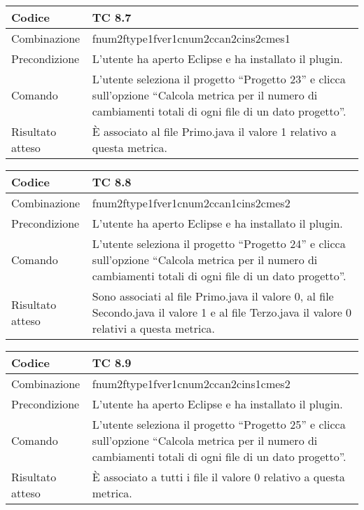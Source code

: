 \begin{table}[ht]
\begin{tabular}{|p{3cm}|p{9cm}|}
\hline
\cellcolor{lightgray}Codice				& TC 8.7								\\
\hline
\cellcolor{lightgray}Combinazione		& fnum2ftype1fver1cnum2ccan2cins2cmes1									\\
\hline
\cellcolor{lightgray}Precondizione		& L'utente ha aperto Eclipse e ha installato il plugin.		\\
\hline
\cellcolor{lightgray}Comando			& L'utente seleziona il progetto ``Progetto 23''  e clicca sull'opzione 
``Calcola metrica per il numero di cambiamenti totali di ogni file di un dato progetto''.	\\
\hline
\cellcolor{lightgray}Risultato atteso	& È associato al file Primo.java il valore 1 relativo a questa metrica.\\
\hline
\end{tabular}
\end{table}

\begin{table}[ht]
\begin{tabular}{|p{3cm}|p{9cm}|}
\hline
\cellcolor{lightgray}Codice				& TC 8.8								\\
\hline
\cellcolor{lightgray}Combinazione		& fnum2ftype1fver1cnum2ccan1cins2cmes2									\\
\hline
\cellcolor{lightgray}Precondizione		& L'utente ha aperto Eclipse e ha installato il plugin.		\\
\hline
\cellcolor{lightgray}Comando			& L'utente seleziona il progetto ``Progetto 24''  e clicca sull'opzione ``Calcola metrica per il numero di cambiamenti totali di ogni file di un dato progetto''.	\\
\hline
\cellcolor{lightgray}Risultato atteso	& Sono associati al file Primo.java il valore 0, al file Secondo.java il valore 1 e al file Terzo.java il valore 0 relativi a questa metrica.\\
\hline
\end{tabular}
\end{table}

\begin{table}[ht]
\begin{tabular}{|p{3cm}|p{9cm}|}
\hline
\cellcolor{lightgray}Codice				& TC 8.9								\\
\hline
\cellcolor{lightgray}Combinazione		& fnum2ftype1fver1cnum2ccan2cins1cmes2									\\
\hline
\cellcolor{lightgray}Precondizione		& L'utente ha aperto Eclipse e ha installato il plugin.		\\
\hline
\cellcolor{lightgray}Comando			& L'utente seleziona il progetto ``Progetto 25''  e clicca sull'opzione ``Calcola metrica per il numero di cambiamenti totali di ogni file di un dato progetto''.	\\
\hline
\cellcolor{lightgray}Risultato atteso	& È associato a tutti i file il valore 0 relativo a questa metrica.\\
\hline
\end{tabular}
\end{table}


